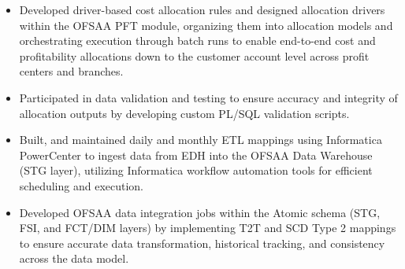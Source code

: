

\begin{itemize}
  \item Developed driver-based cost allocation rules and designed allocation drivers within the OFSAA PFT module, organizing them into allocation models and orchestrating execution through batch runs to enable end-to-end cost and profitability allocations down to the customer account level across profit centers and branches.
  \item Participated in data validation and testing to ensure accuracy and integrity of allocation outputs by developing custom PL/SQL validation scripts.
  \item Built, and maintained daily and monthly ETL mappings using Informatica PowerCenter to ingest data from EDH into the OFSAA Data Warehouse (STG layer), utilizing Informatica workflow automation tools for efficient scheduling and execution.
  \item Developed OFSAA data integration jobs within the Atomic schema (STG, FSI, and FCT/DIM layers) by implementing T2T and SCD Type 2 mappings to ensure accurate data transformation, historical tracking, and consistency across the data model.
\end{itemize}
